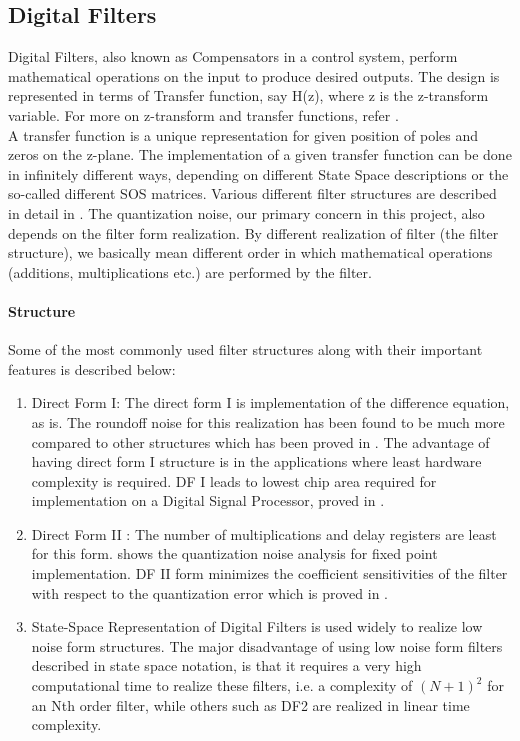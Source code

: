 \documentclass[colorlinks=true,pdfstartview=FitV,linkcolor=blue,
            citecolor=red,urlcolor=magenta]{ligodoc}
\begin{document}
    \subsection{Digital Filters}
    Digital Filters, also known as Compensators in a control system, perform mathematical operations on the input to produce desired outputs. The design is represented in terms of Transfer function, say H(z), where z is the z-transform variable. For more on z-transform and transfer functions, refer \cite{Z transform}. \\
    A transfer function is a unique representation for given position of poles and zeros on the z-plane. The implementation of a given transfer function can be done in infinitely different ways, depending on different State Space descriptions or the so-called different SOS matrices. Various different filter structures are described in detail in \cite{Oppenheim}. The quantization noise, our primary concern in this project, also depends on the filter form realization. By different realization of filter (the filter structure), we basically mean different order in which mathematical operations (additions, multiplications etc.) are performed by the filter. 
    \paragraph{Structure}
Some of the most commonly used filter structures along with their important features is described below:\\
		\begin{enumerate}
		\item Direct Form I: The direct form I is implementation of the difference equation, as is. The roundoff noise for this realization has been found to be much more compared to other structures which has been proved in \cite{Oppenheim}. The advantage of having direct form I structure is in the applications where least hardware complexity is required. DF I leads to lowest chip area required for implementation on a Digital Signal Processor, proved in \cite{Rahmanian}.
		\item Direct Form II : The number of multiplications and delay registers are least for this form. \cite{Oppenheim} shows the quantization noise analysis for fixed point implementation. DF II form minimizes the coefficient sensitivities of the filter with respect to the quantization error which is proved in \cite{Rahmanian}.
		\item State-Space Representation of Digital Filters is used widely to realize low noise form structures. The major disadvantage of using low noise form filters described in state space notation, is that it requires a very high computational time to realize these filters, i.e. a complexity of $(N+1)^{2}$ for an Nth order filter\cite{T L Chang}, while others such as DF2 are realized in linear time complexity.
		\end{enumerate}
	    
\end{document}
